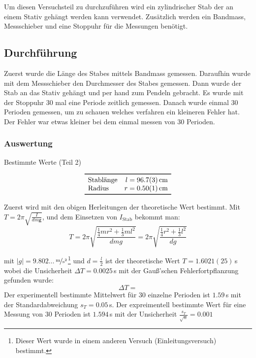 \documentclass[11pt,a4paper]{article}
\renewcommand{\vec}{\boldsymbol}
\begin{document}
Um diesen Versuchsteil zu durchzuführen wird ein zylindrischer Stab der an einem Stativ gehängt werden kann verwendet. Zusätzlich werden ein Bandmass, Messschieber und eine Stoppuhr für die Messungen benötigt. 



\FloatBarrier
\subsection{Durchführung}

Zuerst wurde die Länge des Stabes mittels Bandmass gemessen. Daraufhin wurde mit dem Messschieber den Durchmesser des Stabes gemessen. Dann wurde der Stab an das Stativ gehängt und per hand zum Pendeln gebracht. Es wurde mit der Stoppuhr 30 mal eine Periode zeitlich gemessen. Danach wurde einmal 30 Perioden gemessen, um zu schauen welches verfahren ein kleineren Fehler hat. Der Fehler war etwas kleiner bei dem einmal messen von 30 Perioden.

\subsubsection{Auswertung}

\begin{table}[ht]
\caption{Bestimmte Werte (Teil 2)}
$$
\begin{array}{lr}
	\toprule 
	\textrm{Stablänge} & l = 96.7(3)\,\textrm{cm} \\
	\textrm{Radius} & r = 0.50(1)\,\textrm{cm} \\
	\bottomrule 
\end{array}
$$
\end{table}

Zuerst wird mit den obigen Herleitungen der theoretische Wert bestimmt. Mit $T = 2\pi \sqrt{\frac{I}{dm\vec{g}}}$, und dem Einsetzen von $I_{\textrm{Stab}}$ bekommt man:
$$T = 2\pi \sqrt{\frac{\frac{1}{4} m r^2 + \frac{1}{3} m l^2}{dmg}} = 2\pi \sqrt{\frac{\frac{1}{4} r^2 + \frac{1}{3} l^2}{dg}}$$

mit $|g|=9.802\dots$\,$\nicefrac{\textrm{m}}{\textrm{s}^2}$\footnote{Dieser Wert wurde in einem anderen Versuch (Einleitungsversuch) bestimmt.} und $d = \frac{l}{2}$ ist der theoretische Wert $T = 1.6021(25)$\,s wobei die Unsicherheit $\Delta T = 0.0025$\,s mit der Gauß'schen Fehlerfortpflanzung gefunden wurde:
$$\Delta T = $$
Der experimentell bestimmte Mittelwert für 30 einzelne Perioden ist $1.59$\,s mit der Standardabweichung $s_T = 0.05$\,s.
Der expreimentell bestimmte Wert für eine Messung von 30 Perioden ist $1.594\,$s mit der Unsicherheit $\frac{s_T}{\sqrt{n}} = 0.001$ 
\end{document}
